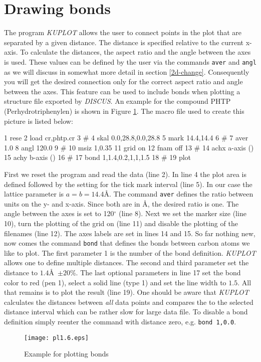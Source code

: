 
\section{Drawing bonds \label{1d-bond}}

The program {\it KUPLOT} allows the user to connect points in the
plot that are separated by a given distance. The distance is
specified relative to the current x-axis. To calculate the
distances, the aspect ratio and the angle between the axes is used.
These values can be defined by the user via the commands {\tt aver}
and {\tt angl} as we will discuss in somewhat more detail in section
\ref{2d-change}. Consequently you will get the desired connection
only for the correct aspect ratio and angle between the axes. This
feature can be used to include bonds when plotting a structure file
exported by {\it DISCUS}. An example for the compound PHTP
(Perhydrotriphenylen) is shown in Figure \ref{pl1-fig6}. The macro
file used to create this picture is listed below:
%
\begin{MacVerbatim}
      1  rese
      2  load cr,phtp.cr
      3  #
      4  skal 0.0,28.8,0.0,28.8
      5  mark 14.4,14.4
      6  #
      7  aver 1.0
      8  angl 120.0
      9  #
     10  msiz 1,0.35
     11  grid on
     12  fnam off
     13  #
     14  achx a-axis (\A)
     15  achy b-axis (\A)
     16  #
     17  bond 1,1.4,0.2,1,1,1.5
     18  #
     19  plot
\end{MacVerbatim}
%
First we reset the program and read the data (line 2). In line 4 the
plot area is defined followed by the setting for the tick mark
interval (line 5). In our case the lattice parameter is
$a=b=14.4$\AA. The command {\tt aver} defines the ratio between
units on the y- and x-axis. Since both are in \AA, the desired ratio
is one. The angle between the axes is set to 120$^{\circ}$ (line 8).
Next we set the marker size (line 10), turn the plotting of the grid
on (line 11) and disable the plotting of the filenames (line 12).
The axes labels are set in lines 14 and 15. So far nothing new, now
comes the command {\tt bond} that defines the bonds between carbon
atoms we like to plot. The first parameter 1 is the number of the
bond definition. {\it KUPLOT} allows one to define multiple
distances. The second and third parameter set the distance to
$1.4$\AA\ $\pm 20$\%. The last optional parameters in line 17 set
the bond color to red (pen 1), select a solid line (type 1) and set
the line width to $1.5$. All that remains is to plot the result
(line 19). One should be aware that {\it KUPLOT} calculates the
distances between {\it all} data points and compares the to the
selected distance interval which can be rather slow for large data
file. To disable a bond definition simply reenter the command with
distance zero, e.g. {\tt bond 1,0.0}.
%
\begin{figure}[!tb]
   \centering
   \texttt{[image: pl1.6.eps]}
   \caption{Example for plotting bonds}
   \label{pl1-fig6}
\end{figure}

